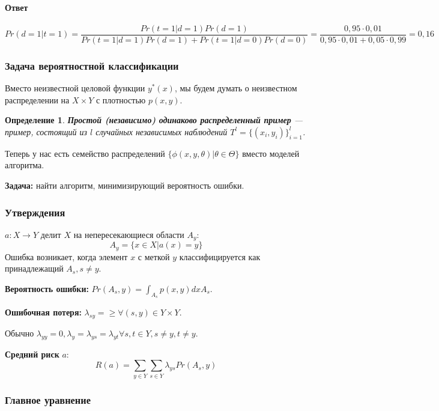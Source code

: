 \documentclass[10pt,a4paper,oneside,titlepage]{report}
\theoremstyle{defenition}
\newtheorem*{defenition}{Определение}
\theoremstyle{theorem}
\begin{document}
\paragraph{Ответ}

$$
Pr(d = 1 | t = 1) = \frac{Pr(t = 1 | d = 1)Pr(d = 1)}{Pr(t = 1 | d = 1)Pr(d = 1) + Pr(t = 1 | d = 0)Pr(d = 0)} = \frac{0,95\cdot 0,01}{0,95\cdot0,01 + 0,05\cdot0,99} = 0,16
$$

\subsubsection{Задача вероятностной классификации}

Вместо неизвестной целовой функции $y^*(x)$, мы будем думать о неизвестном распределении на $X\times Y$ с плотностью $p(x, y)$.

\begin{defenition}
	{\bfseries Простой (независимо) одинаково распределенный пример} --- пример, состоящий из $l$ случайных независимых наблюдений $T^l = \{(x_i, y_i)\}^l_{i=1}$.
\end{defenition} 

Теперь у нас есть семейство распределений $\{\phi (x, y, \theta) | \theta \in \Theta\}$ вместо моделей алгоритма.

{\bfseries Задача:} найти алгоритм, минимизирующий вероятность ошибки.

\subsubsection{Утверждения}

$a: X\to Y$ делит $X$ на непересекающиеся области $A_y$:
$$
A_y = \{x \in X | a(x) = y\}
$$
Ошибка возникает, когда элемент $x$ с меткой $y$ классифицируется как принадлежащий $A_s, s \ne y$.

{\bfseries Вероятность ошибки:} $Pr(A_s, y) = \int_{A_s}p(x,y)dxA_s$.

{\bfseries Ошибочная потеря:} $\lambda_{sy} = \ge \forall (s, y) \in Y \times Y$.

Обычно $\lambda_{yy} = 0, \lambda_y = \lambda_{ys} = \lambda_{yt} \forall s, t \in Y, s \ne y, t \ne y$.

{\bfseries Средний риск} $a$:
$$
R(a) = \sum_{y\in Y}\sum_{s\in Y}\lambda_{ys}Pr(A_s, y)
$$ 

\subsubsection{Главное уравнение}
\end{document}
